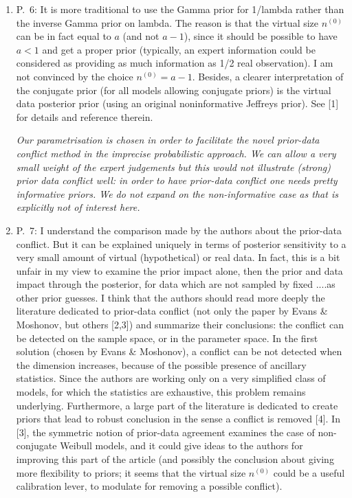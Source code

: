 \documentclass[Journal,SectionNumbers,SingleSpace,InsideFigs]{ascelike}
\newcommand{\uz}{^{(0)}} %
\def\nz{n\uz}
\begin{document}
\begin{enumerate}
\smallskip
\item P.~6: It is more traditional to use the Gamma prior for 1/lambda rather than the inverse Gamma prior on lambda.
The reason is that the virtual size $\nz$ can be in fact equal to $a$ (and not $a-1$),
since it should be possible to have $a<1$ and get a proper prior
(typically, an expert information could be considered as providing as much information as 1/2 real observation).
I am not convinced by the choice $\nz=a-1$.
Besides, a clearer interpretation of the conjugate prior (for all models allowing conjugate priors)
is the virtual data posterior prior (using an original noninformative Jeffreys prior). See [1] for details and reference therein.

\smallskip
\emph{Our parametrisation is chosen in order to facilitate the novel prior-data conflict method in the imprecise probabilistic approach.
We can allow a very small weight of the expert judgements but this would not illustrate (strong) prior data conflict well:
in order to have prior-data conflict one needs pretty informative priors.
We do not expand on the non-informative case as that is explicitly not of interest here.}

\smallskip
\item P.~7: I understand the comparison made by the authors about the prior-data conflict.
But it can be explained uniquely in terms of posterior sensitivity to a very small amount of virtual (hypothetical) or real data.
In fact, this is a bit unfair in my view to examine the prior impact alone,
then the prior and data impact through the posterior, for data which are not sampled by fixed ....as other prior guesses.
I think that the authors should read more deeply the literature dedicated to prior-data conflict
(not only the paper by Evans \& Moshonov, but others [2,3]) and summarize their conclusions:
the conflict can be detected on the sample space, or in the parameter space.
In the first solution (chosen by Evans \& Moshonov), a conflict can be not detected when the dimension increases,
because of the possible presence of ancillary statistics.
Since the authors are working only on a very simplified class of models,
for which the statistics are exhaustive, this problem remains underlying.
Furthermore, a large part of the literature is dedicated to create priors
that lead to robust conclusion in the sense a conflict is removed [4].
In [3], the symmetric notion of prior-data agreement examines the case of non-conjugate Weibull models,
and it could give ideas to the authors for improving this part of the article
(and possibly the conclusion about giving more flexibility to priors;
it seems that the virtual size $\nz$ could be a useful calibration lever, to modulate for removing a possible conflict).


\end{enumerate}
\end{document}
